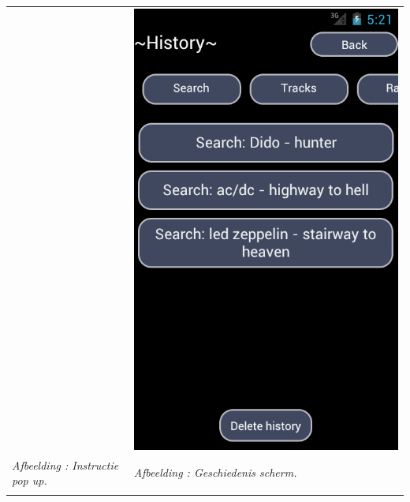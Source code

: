 \documentclass[11pt,a4paper]{article}
\newcounter{figc}
\newcommand{\figID} {%
   \stepcounter{figc}%
   \thefigc}
\begin{document}
{\begin{tabular} {p{7cm} >{\centering\arraybackslash}p{7cm}@{\hskip 0.5in}}
		& \includegraphics[scale=0.37]{Pictures/device-2013-05-26-192153.png} \\
		
		\centering \small \textit{Afbeelding \figID : Instructie pop up.}  \normalsize
		&  \small \textit{Afbeelding \figID : Geschiedenis scherm.} \\  \normalsize
		\vspace{1pt} & \vspace{1pt} \\
		

\end{tabular}}
\end{document}
